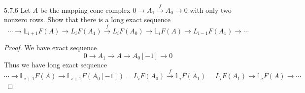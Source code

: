 \documentclass[../main.tex]{subfiles}
\begin{document}
\begin{customexercise}{5.7.6}
Let $A$ be the mapping cone complex $0\to A_1\xrightarrow fA_0\to0$ with only two nonzero rows. Show that there is a long exact sequence
\[\cdots\to \mathbb L_{i+1}F(A)\to L_{i}F(A_1)\xrightarrow fL_iF(A_0)\to\mathbb L_iF(A)\to L_{i-1}F(A_1)\to\cdots\]
\end{customexercise}

\begin{proof}
We have exact sequence
\[0\to A_1\to A\to A_0[-1]\to0\]
Thus we have long exact sequence
\[\cdots\to\mathbb L_{i+1}F(A)\to\mathbb L_{i+1}F(A_0[-1])=L_iF(A_0)\xrightarrow f\mathbb L_iF(A_1)=L_iF(A_1)\to\mathbb L_iF(A)\to\cdots\]
\end{proof}
\end{document}
